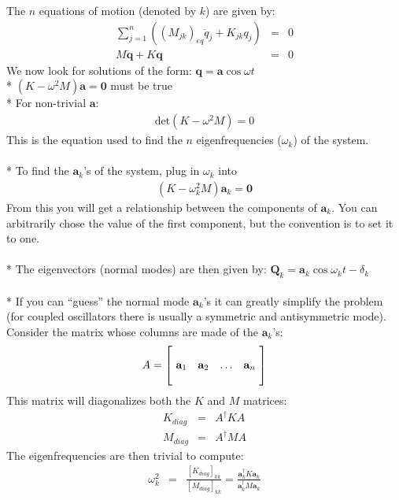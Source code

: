 The \(n\) equations of motion (denoted by \(k\)) are given by:
\begin{eqnarray}
\displaystyle \sum_{j=1}^{n}\left(\left(M_{jk}\right)_{eq}\ddot{q}_j+K_{jk}q_j\right)&=&0 \nonumber\\
M\ddot{\mathbf{q}}+K\mathbf{q}&=&0\nonumber
\end{eqnarray}
We now look for solutions of the form: \(\mathbf{q}=\mathbf{a}\cos{\omega t}\)\\*
\(\left(K-\omega^2M\right)\mathbf{a}=\mathbf{0}\) must be true\\*
For non-trivial \(\mathbf{a}\):
\begin{eqnarray}
\mathrm{det}\left(K-\omega^2M\right)=0 \nonumber
\end{eqnarray}
This is the equation used to find the \(n\) eigenfrequencies (\(\omega_k\)) of the system.\\\\*
To find the \(\mathbf{a}_k\)'s of the system, plug in \(\omega_k\) into
\begin{eqnarray}
\left(K-\omega_k^2M\right)\mathbf{a}_k=\mathbf{0} \nonumber
\end{eqnarray}
From this you will get a relationship between the components of \(\mathbf{a}_k\).
You can arbitrarily chose the value of the first component, but the convention is to set it to one.\\\\*
The eigenvectors (normal modes) are then given by: \(\mathbf{Q}_k=\mathbf{a}_k\cos{\omega_k t -\delta_k}\)\\\\*
If you can ``guess'' the normal mode \(\mathbf{a}_k\)'s it can greatly simplify the problem (for coupled oscillators there is usually a symmetric and antisymmetric mode).
Consider the matrix whose columns are made of the \(\mathbf{a}_k\)'s:
\begin{eqnarray}
A=\left[\!
  \begin{array}{ c c c c }
       & & &  \\
     \mathbf{a}_1 & \mathbf{a}_2 & \ldots & \mathbf{a}_n \\
      & & &
  \end{array} \!\right] \nonumber
\end{eqnarray}
This matrix will diagonalizes both the \(K\) and \(M\) matrices:
\begin{eqnarray}
K_{diag}&=&A^{\dagger}KA \nonumber\\
M_{diag}&=&A^{\dagger}MA \nonumber
\end{eqnarray}
The eigenfrequencies are then trivial to compute:
\begin{eqnarray}
\omega_k^2&=&\frac{\left[K_{diag}\right]_{kk}}{\left[M_{diag}\right]_{kk}} = \frac{\mathbf{a}_k^{\dagger}K\mathbf{a}_k}{\mathbf{a}_k^{\dagger}M\mathbf{a}_k} \nonumber
\end{eqnarray}

